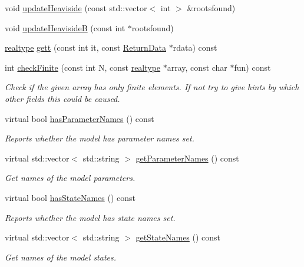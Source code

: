 \begin{DoxyCompactItemize}
void \mbox{\hyperlink{classamici_1_1_model_ae053072690046bd24225447de93a9e84}{update\+Heaviside}} (const std\+::vector$<$ int $>$ \&rootsfound)
\item 
void \mbox{\hyperlink{classamici_1_1_model_a430edd546832d0abbea6472eb7e43da8}{update\+HeavisideB}} (const int $\ast$rootsfound)
\item 
\mbox{\hyperlink{namespaceamici_a1bdce28051d6a53868f7ccbf5f2c14a3}{realtype}} \mbox{\hyperlink{classamici_1_1_model_a09e0a747a99fb59657e71690ce69726b}{gett}} (const int it, const \mbox{\hyperlink{classamici_1_1_return_data}{Return\+Data}} $\ast$rdata) const
\item 
int \mbox{\hyperlink{classamici_1_1_model_a4c38f5beea9e36aa20a089307edb5fed}{check\+Finite}} (const int N, const \mbox{\hyperlink{namespaceamici_a1bdce28051d6a53868f7ccbf5f2c14a3}{realtype}} $\ast$array, const char $\ast$fun) const
\begin{DoxyCompactList}\small\item\em Check if the given array has only finite elements. If not try to give hints by which other fields this could be caused. \end{DoxyCompactList}\item 
virtual bool \mbox{\hyperlink{classamici_1_1_model_a87eb819581d1ca627e5d5ab35ae8add9}{has\+Parameter\+Names}} () const
\begin{DoxyCompactList}\small\item\em Reports whether the model has parameter names set. \end{DoxyCompactList}\item 
virtual std\+::vector$<$ std\+::string $>$ \mbox{\hyperlink{classamici_1_1_model_a7bc0cf1cdd032486ba923fc1d9678262}{get\+Parameter\+Names}} () const
\begin{DoxyCompactList}\small\item\em Get names of the model parameters. \end{DoxyCompactList}\item 
virtual bool \mbox{\hyperlink{classamici_1_1_model_a219d9d04b7eeed20cf4ba36536cd0a4c}{has\+State\+Names}} () const
\begin{DoxyCompactList}\small\item\em Reports whether the model has state names set. \end{DoxyCompactList}\item 
virtual std\+::vector$<$ std\+::string $>$ \mbox{\hyperlink{classamici_1_1_model_a1c55f5cf94db51bb2bbb26d4c425eb0a}{get\+State\+Names}} () const
\begin{DoxyCompactList}\small\item\em Get names of the model states. \end{DoxyCompactList}\item 

\end{DoxyCompactItemize}
